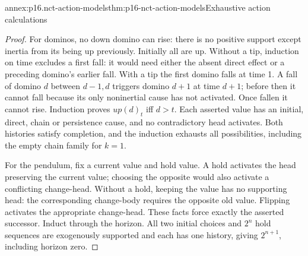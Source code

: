 \begin{annexitem}{annex:p16.nct-action-models}{thm:p16-nct-action-models}{Exhaustive action calculations}
\begin{proof}
For dominos, no down domino can rise: there is no positive support except
inertia from its being up previously. Initially all are up.
Without a tip, induction on time excludes a first fall: it would need
either the absent direct effect or a preceding domino's earlier fall.
With a tip the first domino falls at time 1.
A fall of domino \(d\) between \(d-1,d\) triggers domino \(d+1\) at
time \(d+1\); before then it cannot fall because its only noninertial cause
has not activated. Once fallen it cannot rise.
Induction proves \(up(d)_t\) iff \(d>t\).
Each asserted value has an initial, direct, chain or persistence cause,
and no contradictory head activates. Both histories satisfy completion,
and the induction exhausts all possibilities, including the empty chain
family for \(k=1\).

For the pendulum, fix a current value and hold value.
A hold activates the head preserving the current value; choosing the
opposite would also activate a conflicting change-head.
Without a hold, keeping the value has no supporting head: the corresponding
change-body requires the opposite old value. Flipping activates the
appropriate change-head. These facts force exactly the asserted successor.
Induct through the horizon. All two initial choices and \(2^n\) hold
sequences are exogenously supported and each has one history,
giving \(2^{n+1}\), including horizon zero.
\end{proof}
\end{annexitem}

